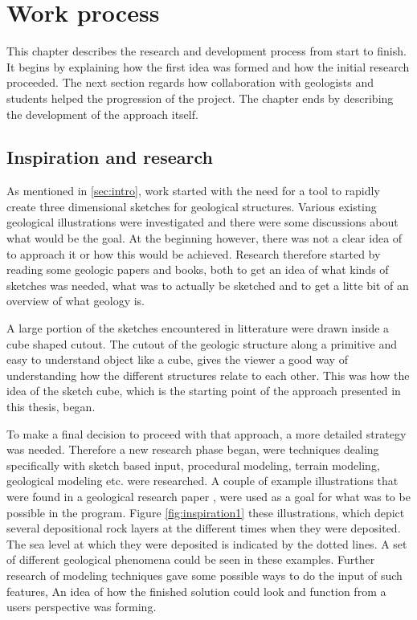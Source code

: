 \documentclass[a4paper,12pt]{report}
\newcommand{\secref}[1]{\autoref{#1}}
\begin{document}
\clearpage



\chapter{Work process}
This chapter describes the research and development process from start to finish. It begins by explaining how the first idea was formed and how the initial research proceeded. The next section regards how collaboration with geologists and students helped the progression of the project. The chapter ends by describing the development of the approach itself.
\label{subsec:work}
\section{Inspiration and research}
As mentioned in \secref{sec:intro}, work started with the need for a tool to rapidly create three dimensional sketches for geological structures. Various existing geological illustrations were investigated and there were some discussions about what would be the goal. At the beginning however, there was not a clear idea of to approach it or how this would be achieved. Research therefore started by reading some geologic papers and books, both to get an idea of what kinds of sketches was needed, what was to actually be sketched and to get a litte bit of an overview of what geology is.

A large portion of the sketches encountered in litterature were drawn inside a cube shaped cutout. The cutout of the geologic structure along a primitive and easy to understand object like a cube, gives the viewer a good way of understanding how the different structures relate to each other. This was how the idea of the sketch cube, which is the starting point of the approach presented in this thesis, began.

To make a final decision to proceed with that approach, a more detailed strategy was needed. Therefore a new research phase began, were techniques dealing specifically with sketch based input, procedural modeling, terrain modeling, geological modeling etc. were researched. A couple of example illustrations that were found in a geological research paper \cite{neal1993sequence}, were used as a goal for what was to be possible in the program. Figure \ref{fig:inspiration1} these illustrations, which depict several depositional rock layers at the different times when they were deposited. The sea level at which they were deposited is indicated by the dotted lines. A set of different geological phenomena could be seen in these examples. Further research of modeling techniques gave some possible ways to do the input of such features, An idea of how the finished solution could look and function from a users perspective was forming.
\end{document}
